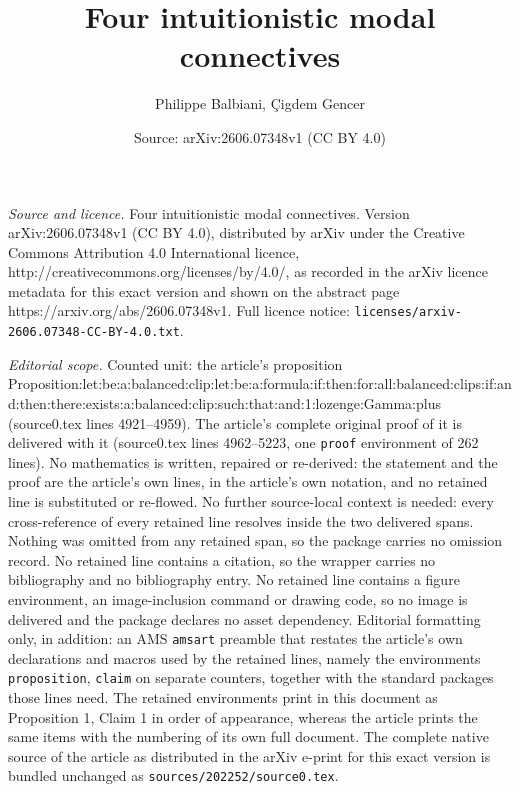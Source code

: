 \documentclass[10pt,a4paper]{amsart}
\title{Four intuitionistic modal connectives}
\author{Philippe Balbiani, \c{C}igdem Gencer}
\date{Source: arXiv:2606.07348v1 (CC BY 4.0)}
\begin{document}
\maketitle

\noindent\emph{Source and licence.} Four intuitionistic modal connectives. Version arXiv:2606.07348v1 (CC BY 4.0), distributed by arXiv under the Creative Commons Attribution 4.0 International licence, http://creativecommons.org/licenses/by/4.0/, as recorded in the arXiv licence metadata for this exact version and shown on the abstract page https://arxiv.org/abs/2606.07348v1. Full licence notice: \texttt{licenses/arxiv-2606.07348-CC-BY-4.0.txt}.\par\smallskip

\noindent\textit{Editorial scope.} Counted unit: the article's proposition Proposition:let:be:a:balanced:clip:let:be:a:formula:if:then:for:all:balanced:clips:if:and:then:there:exists:a:balanced:clip:such:that:and:1:lozenge:Gamma:plus (source0.tex lines 4921--4959). The article's complete original proof of it is delivered with it (source0.tex lines 4962--5223, one \texttt{proof} environment of 262 lines). No mathematics is written, repaired or re-derived: the statement and the proof are the article's own lines, in the article's own notation, and no retained line is substituted or re-flowed.  No further source-local context is needed: every cross-reference of every retained line resolves inside the two delivered spans.  Nothing was omitted from any retained span, so the package carries no omission record.  No retained line contains a citation, so the wrapper carries no bibliography and no bibliography entry.  No retained line contains a figure environment, an image-inclusion command or drawing code, so no image is delivered and the package declares no asset dependency.  Editorial formatting only, in addition: an AMS \texttt{amsart} preamble that restates the article's own declarations and macros used by the retained lines, namely the environments \texttt{proposition}, \texttt{claim} on separate counters, together with the standard packages those lines need.  The retained environments print in this document as Proposition 1, Claim 1 in order of appearance, whereas the article prints the same items with the numbering of its own full document.  The complete native source of the article as distributed in the arXiv e-print for this exact version is bundled unchanged as \texttt{sources/202252/source0.tex}.
\end{document}
